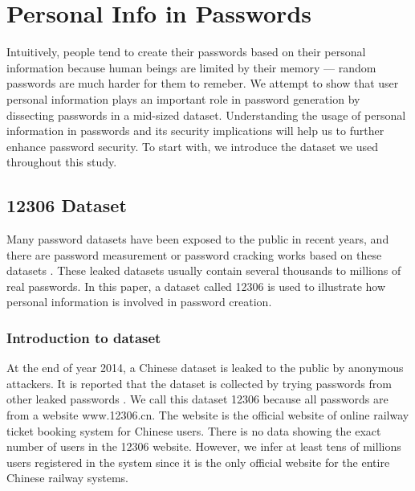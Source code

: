 \section{Personal Info in Passwords}
\label{personalinfo}
Intuitively, people tend to create their passwords based on their personal information because human beings are limited by their memory --- random passwords are much harder for them to remeber. We attempt to show that user personal information plays an important role in password generation by dissecting passwords in a mid-sized dataset. 
Understanding the usage of personal information in passwords and its security implications will help us to further enhance password security. To start with, we introduce the dataset we used throughout this study. 


\subsection{12306 Dataset}
Many password datasets have been exposed to the public in recent years, and there are password measurement or password cracking works based on these datasets \cite{bonneau2012science, li2014large}. These leaked datasets usually contain several thousands to millions of real passwords. In this paper, a dataset called 12306 is used to illustrate how personal information is involved in password creation.

\subsubsection{Introduction to dataset}
At the end of year 2014, a Chinese dataset is leaked to the public by anonymous attackers. It is reported that the dataset is collected by trying passwords from other leaked passwords \cite{tencentnews}. We call this dataset 12306 because all passwords are from a website www.12306.cn. The website is the official website of online railway ticket booking system for Chinese users. There is no data showing the exact number of users in the 12306 website. However, we infer at least tens of millions users registered in the system since it is the only official website for the entire Chinese railway systems.

